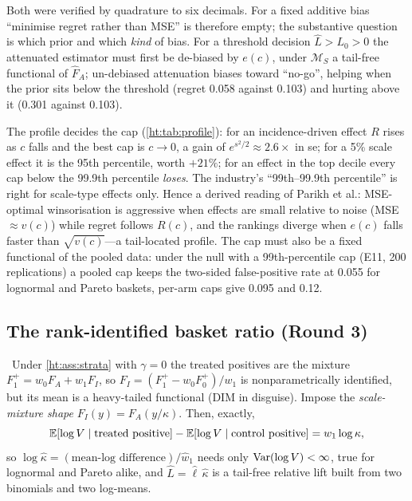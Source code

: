 Both were verified by quadrature to six decimals. For a fixed additive bias ``minimise regret rather than MSE'' is therefore empty; the substantive question is which prior and which \emph{kind} of bias. For a threshold decision $\hat L > L_0 > 0$ the attenuated estimator must first be de-biased by $e(c)$, under $\mathcal M_S$ a tail-free functional of $\hat F_A$; un-debiased attenuation biases toward ``no-go'', helping when the prior sits below the threshold (regret 0.058 against 0.103) and hurting above it (0.301 against 0.103).

The profile decides the cap (\cref{ht:tab:profile}): for an incidence-driven effect $R$ rises as $c$ falls and the best cap is $c \to 0$, a gain of $e^{s^2/2} \approx 2.6\times$ in se; for a 5\% scale effect it is the 95th percentile, worth $+21\%$; for an effect in the top decile every cap below the 99.9th percentile \emph{loses}. The industry's ``99th--99.9th percentile'' is right for scale-type effects only. Hence a derived reading of Parikh et al.: MSE-optimal winsorisation is aggressive when effects are small relative to noise (MSE $\approx v(c)$) while regret follows $R(c)$, and the rankings diverge when $e(c)$ falls faster than $\sqrt{v(c)}$---a tail-located profile. The cap must also be a fixed functional of the pooled data: under the null with a 99th-percentile cap (E11, 200 replications) a pooled cap keeps the two-sided false-positive rate at 0.055 for lognormal and Pareto baskets, per-arm caps give 0.095 and 0.12.

\subsection{The rank-identified basket ratio (Round 3)}

\begin{construction}
\label{ht:con:rank}
\tagConjecture\ Under \cref{ht:ass:strata} with $\gamma = 0$ the treated positives are the mixture $F_1^+ = w_0F_A + w_1F_I$, so $F_I = (F_1^+ - w_0F_0^+)/w_1$ is nonparametrically identified, but its mean is a heavy-tailed functional (DIM in disguise). Impose the \emph{scale-mixture shape} $F_I(y) = F_A(y/\kappa)$. Then, exactly,
\begin{equation}
\mathbb{E}[\log V \mid \text{treated positive}] - \mathbb{E}[\log V \mid \text{control positive}] = w_1\log\kappa,
\label{eq:ht:rank}
\end{equation}
so $\log\hat\kappa = (\text{mean-log difference})/\hat w_1$ needs only $\operatorname{Var}(\log V) < \infty$, true for lognormal and Pareto alike, and $\hat L = \hat\ell\,\hat\kappa$ is a tail-free relative lift built from two binomials and two log-means.
\end{construction}

